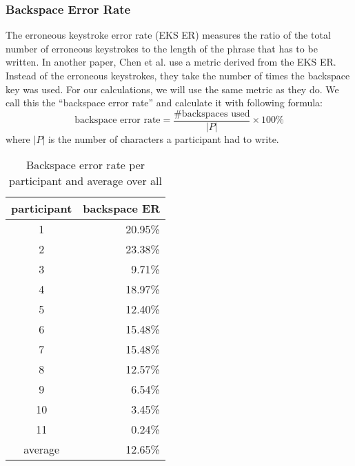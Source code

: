 \subsubsection{Backspace Error Rate}
The erroneous keystroke error rate (EKS ER) \cite{ArifTextEntry} measures the ratio of the total number of erroneous keystrokes to the length of the phrase that has to be written. In another paper, Chen et al. \cite{10.1145/3290607.3312762} use a metric derived from the EKS ER. Instead of the erroneous keystrokes, they take the number of times the backspace key was used. For our calculations, we will use the same metric as they do. We call this the ``backspace error rate'' and calculate it with following formula:
\begin{equation}
    \text{backspace error rate} = \frac{\text{\#backspaces used}}{\lvert P \rvert} \times 100\%
\end{equation}
where $\lvert P \rvert$ is the number of characters a participant had to write.
\iffalse
\begin{figure}[H]
    \centering
    \makebox[\textwidth][c]{
        \centering
        \subbottom[backspace error rate compared to WPM\label{fig:error_backspace:error_backspace1}]{\texttt{[image: backspace\_error2.pdf]}}\hspace{-3.0em}
        \subbottom[a boxplot for the backspace error rate over all participants. The orange line is for the median, the rectangle shows the 25\% and 75\% quartiles, and the upper and lower whiskers show the maximum and minimum.
        \vspace{-3em}
        \label{fig:error_backspace:error_backspace2}]{\texttt{[image: ekser\_boxplot.pdf]}}
    }
    \vspace{2em}
    \caption{shows the backspace error rate in two different ways. (a) with a comparison to the WPM of each participant and (b) a boxplot combining all participants' backspace error values.}
    \label{fig:error_backspace}
\end{figure}
\fi
\begin{table}[H]
    \centering
    \caption{Backspace error rate per participant and average over all}
    \begin{tabular}{cr} \toprule
        participant&backspace ER\\ \midrule
        1 & 20.95\%\\
        2 & 23.38\%\\
        3 & 9.71\%\\
        4 & 18.97\%\\
        5 & 12.40\%\\
        6 & 15.48\%\\
        7 & 15.48\%\\
        8 & 12.57\%\\
        9 & 6.54\%\\
        10 & 3.45\%\\
        11 & 0.24\%\\
        \midrule
        average & 12.65\%\\
        \bottomrule
    \end{tabular}
    \label{tab:backspace_er}
\end{table}
